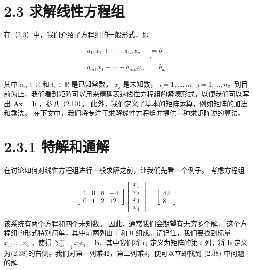 \section*{2.3 求解线性方程组}
\label{sec:2.3}

在（2.3）中，我们介绍了方程组的一般形式，即

\begin{equation}
\begin{array}{clr}
  a_{11}x_1 + \cdots + a_{1n}x_n & = b_1 \\
        & \vdots \\
  a_{m1}x_1 +  \cdots + a_{mn}x_n & = b_m
\end{array}
\tag{2.37}\label{eq:2-37}
\end{equation}

其中 $ a_{ij} \in \mathbb{R} $ 和 $ b_i \in \mathbb{R} $ 是已知常数， $ x_j $ 是未知数， $ i = 1,...,m, \ j = 1,...,n $。到目前为止，我们看到矩阵可以用来精确表达线性方程组的紧凑形式，以便我们可以写出 $ \boldsymbol {Ax} = \boldsymbol{b} $ ，参见（2.10）。 此外，我们定义了基本的矩阵运算，例如矩阵的加法和乘法。 在下文中，我们将专注于求解线性方程组并提供一种求矩阵逆的算法。

\section*{2.3.1 特解和通解}

在讨论如何对线性方程组进行一般求解之前，让我们先看一个例子。 考虑方程组

\begin{equation}
\begin{bmatrix} 1 & 0 & 8 & -4 \\ 0 & 1 & 2 & 12 \end{bmatrix} \begin{bmatrix} x_1 \\ x_2 \\ x_3 \\ x_4 \end{bmatrix} = \begin{bmatrix} 42 \\ 8 \end{bmatrix}
\tag{2.38}\label{eq:2-38}
\end{equation}

该系统有两个方程和四个未知数。 因此，通常我们会期望有无穷多个解。 这个方程组的形式特别简单，其中前两列由 $ 1 $ 和 $ 0 $ 组成。请记住，我们要找到标量 $ x_1,...,x_4 $ ，使得 $ \sum^{4}_{i=1}{x_i \boldsymbol{c}_i} = \boldsymbol{b} $，其中我们将 $ \boldsymbol{c}_i $ 定义为矩阵的第 $ i $ 列，将 $ \boldsymbol{b} $ 定义为(2.38)的右侧。我们对第一列乘42，第二列乘8，便可以立即找到 (2.38) 中问题的解

